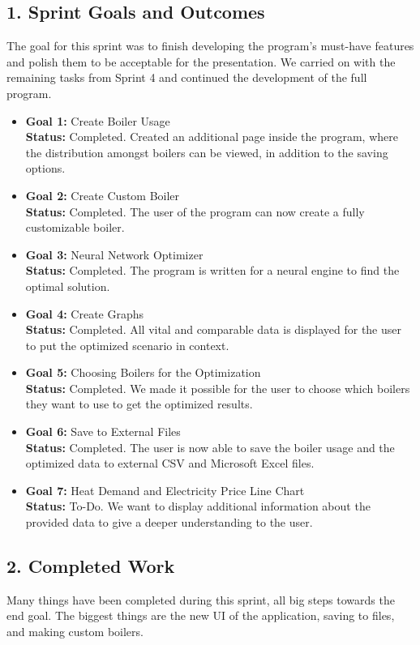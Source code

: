 \documentclass[12pt]{report}
\begin{document}
\subsection*{1. Sprint Goals and Outcomes}
The goal for this sprint was to finish developing the program's must-have features and polish them to be acceptable for the presentation. We carried on with the remaining tasks from Sprint 4 and continued the development of the full program.
\begin{itemize}
    \item \textbf{Goal 1:} Create Boiler Usage\\
    \textbf{Status:} Completed. Created an additional page inside the program, where the distribution amongst boilers can be viewed, in addition to the saving options.
    \item \textbf{Goal 2:} Create Custom Boiler\\
    \textbf{Status:} Completed. The user of the program can now create a fully customizable boiler.
    \item \textbf{Goal 3:} Neural Network Optimizer\\
    \textbf{Status:} Completed. The program is written for a neural engine to find the optimal solution.
    \item \textbf{Goal 4:} Create Graphs\\
    \textbf{Status:} Completed. All vital and comparable data is displayed for the user to put the optimized scenario in context.
    \item \textbf{Goal 5:} Choosing Boilers for the Optimization\\
    \textbf{Status:} Completed. We made it possible for the user to choose which boilers they want to use to get the optimized results.
    \item \textbf{Goal 6:} Save to External Files\\
    \textbf{Status:} Completed. The user is now able to save the boiler usage and the optimized data to external CSV and Microsoft Excel files.
    \item \textbf{Goal 7:} Heat Demand and Electricity Price Line Chart\\
    \textbf{Status:} To-Do. We want to display additional information about the provided data to give a deeper understanding to the user.
\end{itemize}

\subsection*{2. Completed Work}
Many things have been completed during this sprint, all big steps towards the end goal. The biggest things are the new UI of the application, saving to files, and making custom boilers.
\end{document}

